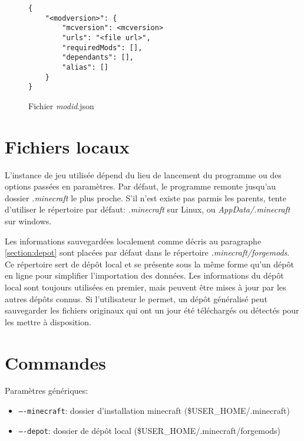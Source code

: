 \documentclass{article}
\begin{document}
\begin{figure}
\begin{verbatim}
{
    "<modversion>": {
        "mcversion": <mcversion>
        "urls": "<file url>",
        "requiredMods": [],
        "dependants": [],
        "alias": []
    }
}
\end{verbatim}
\caption{Fichier \textit{modid}.json}
\label{figure:modid.json}
\end{figure}


\section{Fichiers locaux}
L'instance de jeu utilisée dépend du lieu de lancement du programme ou des options passées en paramètres.
Par défaut, le programme remonte jusqu'au dossier \textit{.minecraft} le plus proche.
S'il n'est existe pas parmis les parents, tente d'utiliser le répertoire par défaut: \textit{.minecraft} sur Linux, ou \textit{AppData/.minecraft} sur windows.

Les informations sauvegardées localement comme décris au paragraphe \ref{section:depot} sont placées par défaut dans le répertoire \textit{.minecraft/forgemods}.
Ce répertoire sert de dépôt local et se présente sous la même forme qu'un dépôt en ligne pour simplifier l'importation des données.
Les informations du dépôt local sont toujours utilisées en premier, mais peuvent être mises à jour par les autres dépôts connus.
Si l'utilisateur le permet, un dépôt généralisé peut sauvegarder les fichiers originaux qui ont un jour été téléchargés ou détectés pour les mettre à disposition.


\section{Commandes}
Paramètres génériques:
\begin{itemize}
    \item \texttt{----minecraft}: dossier d'installation minecraft (\$USER\_HOME/.minecraft)
    \item \texttt{----depot}: dossier de dépôt local (\$USER\_HOME/.minecraft/forgemods)
\end{itemize}
\end{document}
